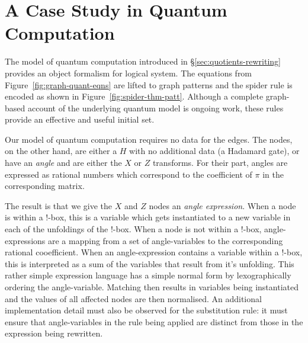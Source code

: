 \documentclass[runningheads]{llncs}
\begin{document}


\section{A Case Study in Quantum Computation}
\label{sec:case-study}

The model of quantum computation introduced in
\S\ref{sec:quotients-rewriting} provides an object formalism for
logical system. The equations from Figure~\ref{fig:graph-quant-eqns}
are lifted to graph patterns and the spider rule is encoded as shown
in Figure~\ref{fig:spider-thm-patt}. Although a complete graph-based
account of the underlying quantum model is ongoing work, these rules
provide an effective and useful initial set. 

Our model of quantum computation requires no data for the edges. The
nodes, on the other hand, are either a $H$ with no additional data (a
Hadamard gate), or have an \emph{angle} and are either the $X$ or $Z$
transforms. For their part, angles are expressed as rational numbers
which correspond to the coefficient of $\pi$ in the corresponding
matrix.

The result is that we give the $X$ and $Z$ nodes an \emph{angle
  expression}. When a node is within a !-box, this is a variable which
gets instantiated to a new variable in each of the unfoldings of the
!-box. When a node is not within a !-box, angle-expressions are a
mapping from a set of angle-variables to the corresponding rational
cooefficient. When an angle-expression contains a variable within a
!-box, this is interpreted as a sum of the variables that result from
it's unfolding. This rather simple expression language has a simple
normal form by lexographically ordering the angle-variable. Matching
then results in variables being instantiated and the values of all
affected nodes are then normalised. An additional implementation
detail must also be observed for the substitution rule: it must ensure
that angle-variables in the rule being applied are distinct from those
in the expression being rewritten.



\end{document}
